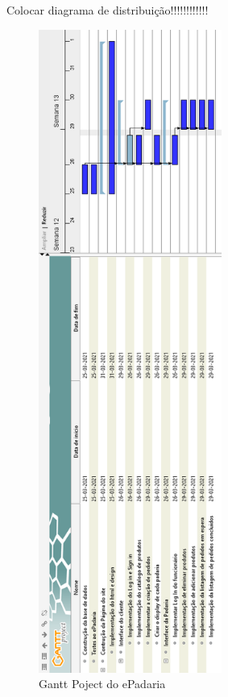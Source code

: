 Colocar diagrama de distribuição!!!!!!!!!!!!
\begin{figure}
	\centering
	\includegraphics[width=6cm]{gantt}
	\caption{Gantt Poject do ePadaria}
	\label{fig:gantt}
\end{figure}




